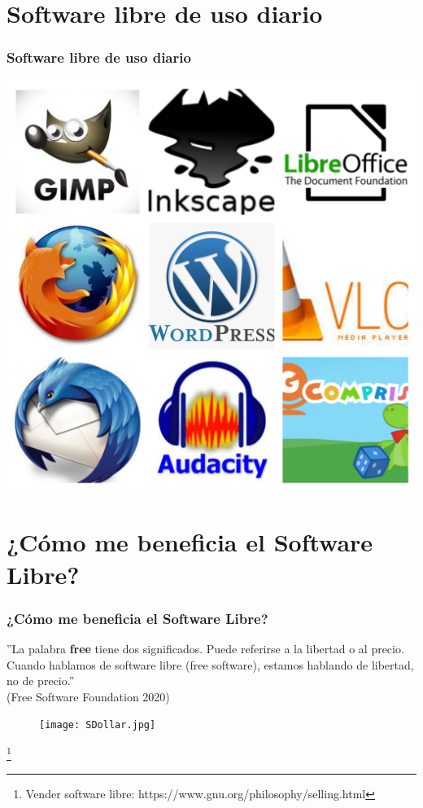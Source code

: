 \documentclass{beamer}
\begin{document}
    \section{Software libre de uso diario}
    \begin{frame}
        \frametitle{Software libre de uso diario}
        \includegraphics[scale=0.25]{BeFunky-collage.jpg}
        \centering
    \end{frame}
    \section{¿Cómo me beneficia el Software Libre?}
    \begin{frame}
     \frametitle{¿Cómo me beneficia el Software Libre?}
     ''La palabra \textbf{free} tiene dos significados. Puede referirse a la libertad o al precio. Cuando hablamos de software libre (free software), estamos hablando de libertad, no de precio.''\\
     (Free Software Foundation 2020)
     \begin{figure}[h]
     \texttt{[image: SDollar.jpg]}
      \centering
     \end{figure}
     \footnote{Vender software libre: https://www.gnu.org/philosophy/selling.html}
    \end{frame}
\end{document}
